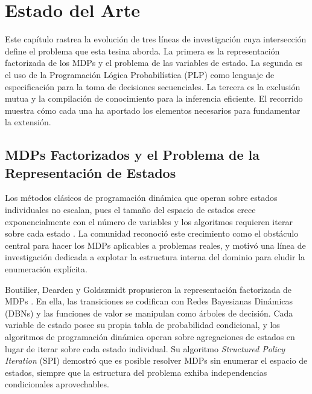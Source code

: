 
\section{Estado del Arte}
\label{ch:estado-del-arte}

Este capítulo rastrea la evolución de tres líneas de investigación cuya intersección define el problema que esta tesina aborda. La primera es la representación factorizada de los MDPs y el problema de las variables de estado. La segunda es el uso de la Programación Lógica Probabilística (PLP) como lenguaje de especificación para la toma de decisiones secuenciales. La tercera es la exclusión mutua y la compilación de conocimiento para la inferencia eficiente. El recorrido muestra cómo cada una ha aportado los elementos necesarios para fundamentar la extensión.

\subsection{MDPs Factorizados y el Problema de la Representación de Estados}
\label{sec:ea-factorizados}

Los métodos clásicos de programación dinámica que operan sobre estados individuales no escalan, pues el tamaño del espacio de estados crece exponencialmente con el número de variables y los algoritmos requieren iterar sobre cada estado \cite{puterman2014markov}. La comunidad reconoció este crecimiento como el obstáculo central para hacer los MDPs aplicables a problemas reales, y motivó una línea de investigación dedicada a explotar la estructura interna del dominio para eludir la enumeración explícita.

Boutilier, Dearden y Goldszmidt propusieron la representación factorizada de MDPs \cite{boutilier2000stochastic}. En ella, las transiciones se codifican con Redes Bayesianas Dinámicas (DBNs) y las funciones de valor se manipulan como árboles de decisión. Cada variable de estado posee su propia tabla de probabilidad condicional, y los algoritmos de programación dinámica operan sobre agregaciones de estados en lugar de iterar sobre cada estado individual. Su algoritmo \textit{Structured Policy Iteration} (SPI) demostró que es posible resolver MDPs sin enumerar el espacio de estados, siempre que la estructura del problema exhiba independencias condicionales aprovechables.

